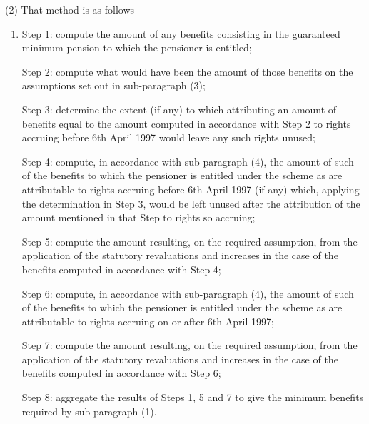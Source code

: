 \documentclass[12pt,a4paper]{article}
\begin{document}
(2) That method is as follows—
\begin{enumerate}\item[]
    Step 1: compute the amount of any benefits consisting in the guaranteed minimum pension to which the pensioner is entitled;

    Step 2: compute what would have been the amount of those benefits on the assumptions set out in sub-paragraph (3);

    Step 3: determine the extent (if any) to which attributing an amount of benefits equal to the amount computed in accordance with Step 2 to rights accruing before 6th April 1997 would leave any such rights unused;

    Step 4: compute, in accordance with sub-paragraph (4), the amount of such of the benefits to which the pensioner is entitled under the scheme as are attributable to rights accruing before 6th April 1997 (if any) which, applying the determination in Step 3, would be left unused after the attribution of the amount mentioned in that Step to rights so accruing;

    Step 5: compute the amount resulting, on the required assumption, from the application of the statutory revaluations and increases in the case of the benefits computed in accordance with Step 4;

    Step 6: compute, in accordance with sub-paragraph (4), the amount of such of the benefits to which the pensioner is entitled under the scheme as are attributable to rights accruing on or after 6th April 1997;

    Step 7: compute the amount resulting, on the required assumption, from the application of the statutory revaluations and increases in the case of the benefits computed in accordance with Step 6;

    Step 8: aggregate the results of Steps 1, 5 and 7 to give the minimum benefits required by sub-paragraph (1). 
\end{enumerate}
\end{document}
